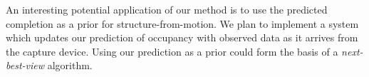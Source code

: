 \documentclass[10pt,twocolumn,letterpaper]{article}
\newcommand{\todo}[1]{\textcolor{red}{TODO: #1}}
\begin{document}
An interesting potential application of our method is to use the predicted completion as a prior for structure-from-motion.
We plan to implement a system which updates our prediction of occupancy with observed data as it arrives from the capture device.
Using our prediction as a prior could form the basis of a \emph{next-best-view} algorithm.



{\small


}

\end{document}
